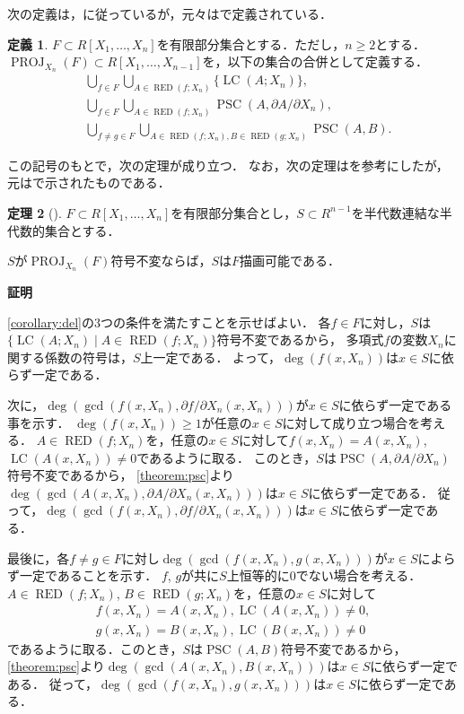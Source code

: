 \documentclass[uplatex, dvipdfmx]{jsarticle}
\makeatletter
\numberwithin{equation}{section}
\renewenvironment{proof}[1][\proofname]{\par
  \pushQED{\qed}%
  \normalfont \topsep6\p@\@plus6\p@\relax
  \trivlist
  \item\relax
  {\bfseries
  #1\@addpunct{.}}\hspace\labelsep\ignorespaces
}{
  \popQED\endtrivlist\@endpefalse
}
\DeclareMathOperator{\PSC}{PSC}
\DeclareMathOperator{\RED}{RED}
\DeclareMathOperator{\LC}{LC}
\DeclareMathOperator{\PROJ}{PROJ}
\theoremstyle{definition}
\newtheorem{definition}{定義}[section]
\newtheorem{theorem}[definition]{定理}
\renewcommand{\proofname}{\textbf{証明}}
\makeatother
\begin{document}
次の定義は，\cite[Section 3]{MR0764184}に従っているが，元々は\cite[Section 2]{MR0403962}で定義されている．
\begin{definition}
$F \subset R[X_1, \dots, X_n]$を有限部分集合とする．ただし，$n \geq 2$とする．
$\PROJ_{X_n}(F) \subset R[X_1, \dots, X_{n-1}]$を，以下の集合の合併として定義する．
\begin{align} 
     &  \bigcup_{f \in F} \bigcup_{A \in \RED(f;X_n)} \{\LC(A;X_n)\},\\
     &  \bigcup_{f \in F} \bigcup_{A \in \RED(f;X_n)} \PSC(A, \partial A / \partial X_n),\\
     &  \bigcup_{f \neq g \in F} \bigcup_{A \in \RED(f;X_n), B \in \RED(g;X_n)} \PSC(A,B).
\end{align}
\end{definition}

この記号のもとで，次の定理が成り立つ．
なお，次の定理は\cite[Theorem 4]{MR0764184}を参考にしたが，元は\cite[Theorem 5]{MR0403962}で示されたものである．

\begin{theorem}[{\cite[Theorem 4]{MR0764184}}]\label{theorem:inv-deline}
$F \subset R[X_1, \dots, X_n]$を有限部分集合とし，$S \subset R^{n-1}$を半代数連結な半代数的集合とする．

$S$が$\PROJ_{X_n}(F)$符号不変ならば，$S$は$F$描画可能である．
\end{theorem}

\begin{proof}
     \cref{corollary:del}の$3$つの条件を満たすことを示せばよい．
     各$f \in F$に対し，$S$は$\{\LC(A; X_n) \mid A \in \RED(f;X_n) \}$符号不変であるから，
     多項式$f$の変数$X_n$に関する係数の符号は，$S$上一定である．
     よって，$\deg(f(x, X_n))$は$x \in S$に依らず一定である．

     次に，$\deg(\gcd(f(x, X_n), \partial f / \partial X_n(x, X_n)))$が$x \in S$に依らず一定である事を示す．
     $\deg(f(x, X_n)) \geq 1$が任意の$x \in S$に対して成り立つ場合を考える．
     $A \in \RED(f;X_n)$を，任意の$x \in S$に対して$f(x, X_n) = A(x,X_n)$, $\LC(A(x,X_n)) \neq 0$であるように取る．
     このとき，$S$は$\PSC(A, \partial A / \partial X_n)$符号不変であるから，
     \cref{theorem:psc}より$\deg(\gcd(A(x, X_n), \partial A / \partial X_n(x, X_n)))$は$x\in S$に依らず一定である．
     従って，$\deg(\gcd(f(x, X_n), \partial f / \partial X_n(x, X_n)))$は$x\in S$に依らず一定である．
     
     最後に，各$f \neq g \in F$に対し$\deg(\gcd(f(x, X_n),g(x,X_n)))$が$x \in S$によらず一定であることを示す．
     $f$, $g$が共に$S$上恒等的に$0$でない場合を考える．
     $A \in \RED(f;X_n)$, $B \in \RED(g;X_n)$を，任意の$x \in S$に対して
     \begin{align}
          f(x, X_n) = A(x,X_n), \LC(A(x,X_n)) \neq 0,\\
          g(x, X_n) = B(x, X_n), \LC(B(x,X_n)) \neq 0
     \end{align}
     であるように取る．このとき，$S$は$\PSC(A, B)$符号不変であるから，
     \cref{theorem:psc}より$\deg(\gcd(A(x, X_n), B(x, X_n)))$は$x\in S$に依らず一定である．
     従って，$\deg(\gcd(f(x, X_n), g(x, X_n)))$は$x\in S$に依らず一定である．
\end{proof}
\end{document}
